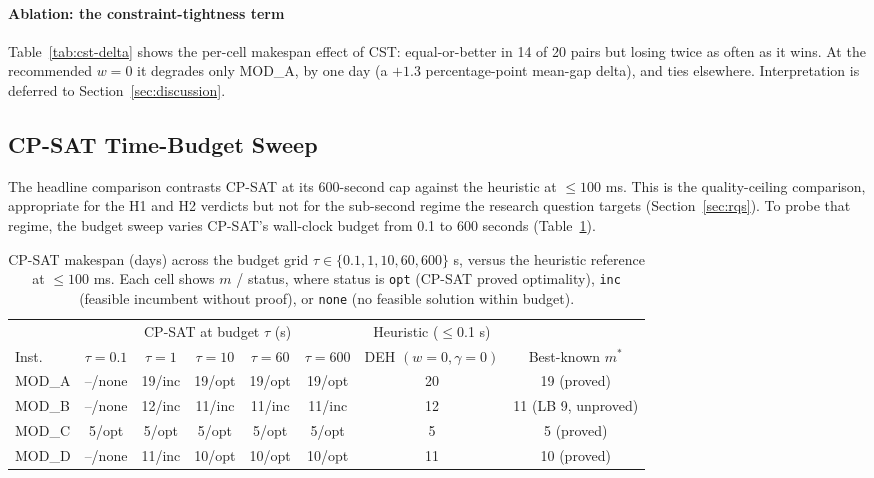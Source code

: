 \documentclass[conference]{IEEEtran}
\begin{document}
\paragraph{Ablation: the constraint-tightness term}
Table~\ref{tab:cst-delta} shows the per-cell makespan effect of CST:
equal-or-better in 14 of 20 pairs but losing twice as often as it
wins. At the recommended $w = 0$ it degrades only MOD\_A, by one day
(a $+1.3$ percentage-point mean-gap delta), and ties elsewhere.
Interpretation is deferred to Section~\ref{sec:discussion}.

\subsection{CP-SAT Time-Budget Sweep}
\label{sec:budget-sweep}

The headline comparison contrasts CP-SAT at its 600-second cap
against the heuristic at $\leq 100$ ms. This is the quality-ceiling
comparison, appropriate for the H1 and H2 verdicts but not for the
sub-second regime the research question targets
(Section~\ref{sec:rqs}). To probe that regime, the budget sweep varies
CP-SAT's wall-clock budget from 0.1 to 600 seconds
(Table~\ref{tab:budget-sweep}).

\begin{table}[!t]
\caption{CP-SAT makespan (days) across the budget grid
$\tau \in \{0.1, 1, 10, 60, 600\}$ s, versus the heuristic reference
at $\leq 100$ ms. Each cell shows $m$ / status, where status is
\texttt{opt} (CP-SAT proved optimality), \texttt{inc} (feasible
incumbent without proof), or \texttt{none} (no feasible solution
within budget).}
\label{tab:budget-sweep}
\centering
\renewcommand{\arraystretch}{1.15}
\begin{tabular}{@{}lccccccc@{}}
\toprule
       & \multicolumn{5}{c}{CP-SAT at budget $\tau$ (s)}
       & Heuristic ($\leq$0.1 s) & \\
\cmidrule(lr){2-6}
Inst.\ & $\tau{=}0.1$ & $\tau{=}1$ & $\tau{=}10$ & $\tau{=}60$ & $\tau{=}600$
       & DEH $(w{=}0, \gamma{=}0)$ & Best-known $m^{*}$ \\
\midrule
MOD\_A & --/none & 19/inc & 19/opt & 19/opt & 19/opt
       & 20 & 19 (proved) \\
MOD\_B & --/none & 12/inc & 11/inc & 11/inc & 11/inc
       & 12 & 11 (LB 9, unproved) \\
MOD\_C & 5/opt   & 5/opt  & 5/opt  & 5/opt  & 5/opt
       & 5  & 5 (proved) \\
MOD\_D & --/none & 11/inc & 10/opt & 10/opt & 10/opt
       & 11 & 10 (proved) \\
\bottomrule
\end{tabular}
\end{table}
\end{document}
